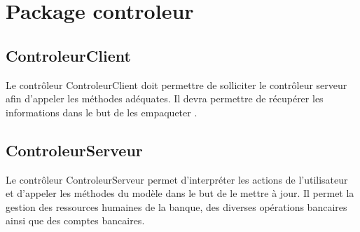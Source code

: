 {\color{green}{Les vues seront reparties selon différentes classes, à savoir AdminR, AjoutPersonnelR, StatistiquesR,
consulterCompteR, AccueilR et EchangerR}}

\section{Package controleur}


\subsection{ControleurClient}
Le contrôleur ControleurClient doit permettre de solliciter le contrôleur serveur afin d'appeler les méthodes adéquates.
Il devra permettre de récupérer les informations dans le but de les empaqueter {\color{red}{en RMI}}
 {\color{green}{en JSON afin de récuperer ces informations en REST}}.

\subsection{ControleurServeur}
Le contrôleur ControleurServeur permet d'interpréter les actions de l'utilisateur et d'appeler les méthodes du modèle
dans le but de le mettre à jour. Il permet la gestion des ressources humaines de la banque, des diverses opérations
bancaires ainsi que des comptes bancaires.
